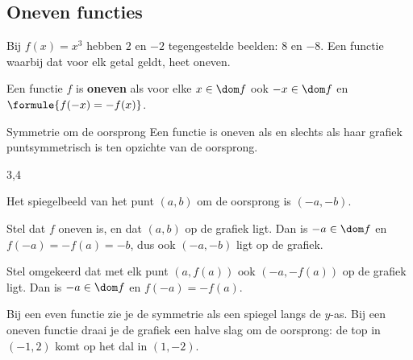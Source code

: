 \subsection{Oneven functies}

Bij $f(x) = x^3$ hebben $2$ en $-2$ tegengestelde beelden: $8$ en $-8$. Een functie waarbij dat voor elk getal geldt, heet oneven.

\begin{theorie}
Een functie $f$ is \textbf{\textcolor{accent}{oneven}} als voor elke $x \in \dom f$ ook $-x \in \dom f$ en $\formule{f(-x) = -f(x)}$.

\begin{stelling}{Symmetrie om de oorsprong}
Een functie is oneven als en slechts als haar grafiek puntsymmetrisch is ten opzichte van de oorsprong.
\end{stelling}

\begin{alleenvoor}{3,4}
\begin{bewijs}
Het spiegelbeeld van het punt $(a, b)$ om de oorsprong is $(-a, -b)$.

Stel dat $f$ oneven is, en dat $(a, b)$ op de grafiek ligt. Dan is $-a \in \dom f$ en $f(-a) = -f(a) = -b$, dus ook $(-a, -b)$ ligt op de grafiek.

Stel omgekeerd dat met elk punt $(a, f(a))$ ook $(-a, -f(a))$ op de grafiek ligt. Dan is $-a \in \dom f$ en $f(-a) = -f(a)$.
\end{bewijs}
\end{alleenvoor}
\end{theorie}


Bij een even functie zie je de symmetrie als een spiegel langs de $y$-as. Bij een oneven functie draai je de grafiek een halve slag om de oorsprong: de top in $(-1, 2)$ komt op het dal in $(1, -2)$.

